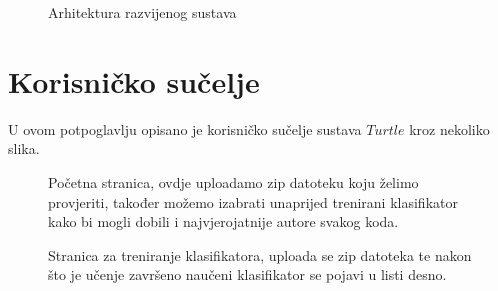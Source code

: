 \begin{figure}[H]
	\centering
	\caption{Arhitektura razvijenog sustava}
	\label{fig:architecture}
\end{figure}

\newpage
\section{Korisničko sučelje}

U ovom potpoglavlju opisano je korisničko sučelje sustava $Turtle$ kroz nekoliko slika.


\begin{figure}[H]
	\centering
	\caption{Početna stranica, ovdje uploadamo zip datoteku koju želimo provjeriti, također možemo izabrati unaprijed trenirani klasifikator kako bi mogli dobili i najvjerojatnije autore svakog koda.}
\end{figure}

\begin{figure}[H]
	\centering
	\caption{Stranica za treniranje klasifikatora, uploada se zip datoteka te nakon što je učenje završeno naučeni klasifikator se pojavi u listi desno.}
\end{figure}

